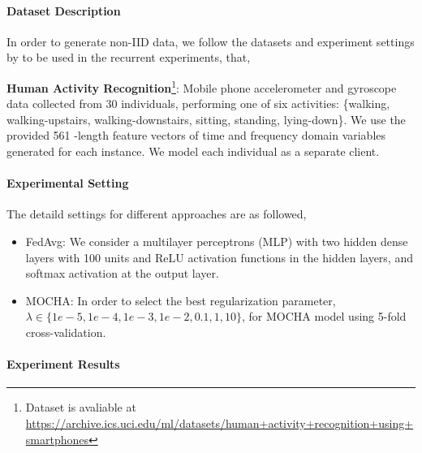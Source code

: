 \documentclass[a4paper,12pt,authoryear]{elegantpaper}
\begin{document}
\paragraph{Dataset Description}

In order to generate non-IID data, we follow the datasets and experiment settings by \cite{corinzia_variational_2021} to be used in the recurrent experiments, that,


\textbf{Human Activity Recognition}\footnote{Dataset is avaliable at \url{https://archive.ics.uci.edu/ml/datasets/human+activity+recognition+using+smartphones}}: Mobile phone accelerometer and gyroscope data collected from 30 individuals, performing one of six activities: \{walking, walking-upstairs, walking-downstairs, sitting, standing, lying-down\}\citep{garcia-gonzalez_public_2020}. We use the provided 561 -length feature vectors of time and frequency domain variables generated for each instance. We model each individual as a separate client.

\paragraph{Experimental Setting}

The detaild settings for different approaches are as followed,
\begin{itemize}
    \item FedAvg: We consider a multilayer perceptrons (MLP) with two hidden dense layers with 100 units and ReLU activation functions in the hidden layers, and softmax activation at the output layer.
    \item MOCHA: In order to select the best regularization parameter,$\lambda\in\{1e-5, 1e-4, 1e-3, 1e-2, 0.1, 1, 10\}$, for MOCHA model using 5-fold cross-validation.
\end{itemize}

\paragraph{Experiment Results}
\end{document}
